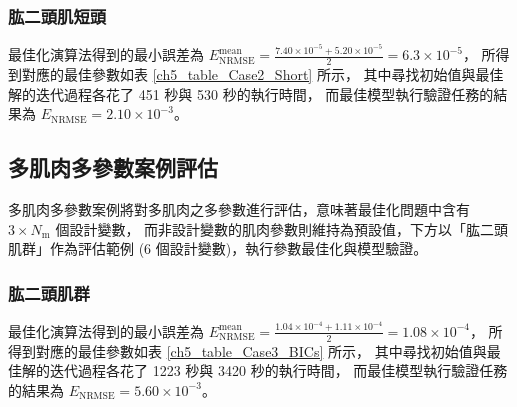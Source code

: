 \subsubsection{肱二頭肌短頭}
最佳化演算法得到的最小誤差為 $E^\mathrm{mean}_\mathrm{NRMSE} = \frac{7.40 \times 10^{-5} + 5.20 \times 10^{-5}}{2} = 6.3 \times 10^{-5}$，
所得到對應的最佳參數如表 \ref{ch5_table_Case2_Short} 所示，
其中尋找初始值與最佳解的迭代過程各花了 451 秒與 530 秒的執行時間，
而最佳模型執行驗證任務的結果為 $E_\mathrm{NRMSE} = 2.10 \times 10^{-3}$。

\begin{table}[!ht]
    \caption[單肌肉多參數案例：肱二頭肌短頭的最佳參數]{單肌肉多參數案例於肱二頭肌短頭的最佳參數}
	\label{ch5_table_Case2_Short}
	\centering
\end{table}

\subsection{多肌肉多參數案例評估}
多肌肉多參數案例將對多肌肉之多參數進行評估，意味著最佳化問題中含有 $3 \times N_\mathrm{m}$ 個設計變數，
而非設計變數的肌肉參數則維持為預設值，下方以「肱二頭肌群」作為評估範例 (6 個設計變數)，執行參數最佳化與模型驗證。

\subsubsection{肱二頭肌群}
最佳化演算法得到的最小誤差為 $E^\mathrm{mean}_\mathrm{NRMSE} = \frac{1.04 \times 10^{-4} + 1.11 \times 10^{-4}}{2} = 1.08 \times 10^{-4}$，
所得到對應的最佳參數如表 \ref{ch5_table_Case3_BICs} 所示，
其中尋找初始值與最佳解的迭代過程各花了 1223 秒與 3420 秒的執行時間，
而最佳模型執行驗證任務的結果為 $E_\mathrm{NRMSE} = 5.60 \times 10^{-3}$。

\begin{table}[!ht]
    \caption[多肌肉多參數案例：肱二頭肌群的最佳參數]{多肌肉多參數案例於肱二頭肌群的最佳參數}
	\label{ch5_table_Case3_BICs}
	\centering
\end{table}

